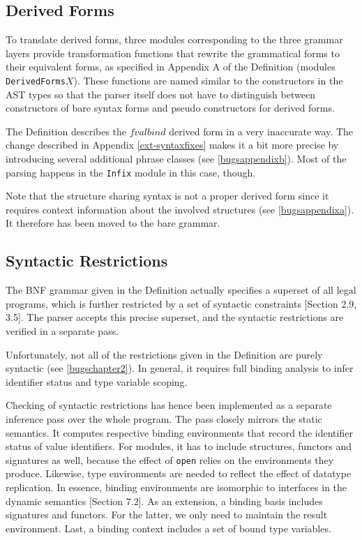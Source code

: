\documentclass[twoside,titlepage]{article}
\begin{document}
\subsection{Derived Forms}
\label{derived}

To translate derived forms, three modules corresponding to the three grammar layers provide transformation functions that rewrite the grammatical forms to their equivalent forms, as specified in Appendix A of the Definition (modules {\tt DerivedForms$X$}). These functions are named similar to the constructors in the AST types so that the parser itself does not have to distinguish between constructors of bare syntax forms and pseudo constructors for derived forms.

The Definition describes the $\mathit{fvalbind}$ derived form in a very inaccurate way. The change described in Appendix \ref{ext-syntaxfixes} makes it a bit more precise by introducing several additional phrase classes (see \ref{bugsappendixb}). Most of the parsing happens in the {\tt Infix} module in this case, though.

Note that the structure sharing syntax is not a proper derived form since it requires context information about the involved structures (see \ref{bugsappendixa}). It therefore has been moved to the bare grammar.


\subsection{Syntactic Restrictions}
\label{restrictions}

The BNF grammar given in the Definition actually specifies a superset of all legal programs, which is further restricted by a set of syntactic constraints [Section 2.9, 3.5]. The parser accepts this precise superset, and the syntactic restrictions are verified in a separate pass.

Unfortunately, not all of the restrictions given in the Definition are purely syntactic (see \ref{bugschapter2}). In general, it requires full binding analysis to infer identifier status and type variable scoping.

Checking of syntactic restrictions has hence been implemented as a separate inference pass over the whole program. The pass closely mirrors the static semantics. It computes respective binding environments that record the identifier status of value identifiers. For modules, it has to include structures, functors and signatures as well, because the effect of {\tt open} relies on the environments they produce. Likewise, type environments are needed to reflect the effect of datatype replication. In essence, binding environments are isomorphic to interfaces in the dynamic semantics [Section 7.2]. As an extension, a binding basis includes signatures and functors. For the latter, we only need to maintain the result environment. Last, a binding context includes a set of bound type variables.
\end{document}

